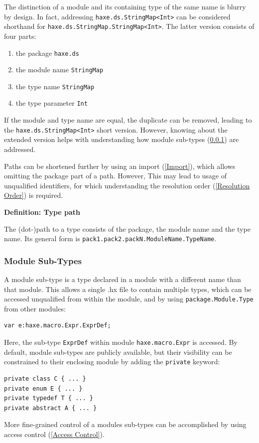 \documentclass{article}
\newcommand{\type}[1]{\texttt{#1}}
\newcommand{\expr}[1]{\texttt{#1}}
\newenvironment{myshaded}
  {\def\FrameCommand{\fboxsep=\topsep\colorbox{bgcolor}}%
  \MakeFramed {\advance\hsize-\width \FrameRestore}}%
 {\endMakeFramed}
\newcommand{\define}[3][Definition]
	{\begin{myshaded}\noindent\textbf{#1: #2}\par\nobreak\noindent\ignorespaces#3\label{def:#2}\end{myshaded}}
\newcommand{\tref}[2]{#1 (\ref{#2})}
\begin{document}
The distinction of a module and its containing type of the same name is blurry by design. In fact, addressing \expr{haxe.ds.StringMap<Int>} can be considered shorthand for \expr{haxe.ds.StringMap.StringMap<Int>}. The latter version consists of four parts:

\begin{enumerate}
	\item the package \expr{haxe.ds}
	\item the module name \expr{StringMap}
	\item the type name \type{StringMap}
	\item the type parameter \type{Int}
\end{enumerate}
If the module and type name are equal, the duplicate can be removed, leading to the \expr{haxe.ds.StringMap<Int>} short version. However, knowing about the extended version helps with understanding how \tref{module sub-types}{Module Sub-Types} are addressed.

Paths can be shortened further by using an \tref{import}{Import}, which allows omitting the package part of a path. However, This may lead to usage of unqualified identifiers, for which understanding the \tref{resolution order}{Resolution Order} is required.

\define{Type path}{The (dot-)path to a type consists of the package, the module name and the type name. Its general form is \expr{pack1.pack2.packN.ModuleName.TypeName}.} 


\subsubsection{Module Sub-Types}
\label{Module Sub-Types}

A module sub-type is a type declared in a module with a different name than that module. This allows a single .hx file to contain multiple types, which can be accessed unqualified from within the module, and by using \expr{package.Module.Type} from other modules:

\begin{lstlisting}
var e:haxe.macro.Expr.ExprDef;
\end{lstlisting}
Here, the sub-type \type{ExprDef} within module \expr{haxe.macro.Expr} is accessed. By default, module sub-types are publicly available, but their visibility can be constrained to their enclosing module by adding the \expr{private} keyword:

\begin{lstlisting}
private class C { ... }
private enum E { ... }
private typedef T { ... }
private abstract A { ... }
\end{lstlisting}
More fine-grained control of a modules sub-types can be accomplished by using \tref{access control}{Access Control}.
\end{document}
